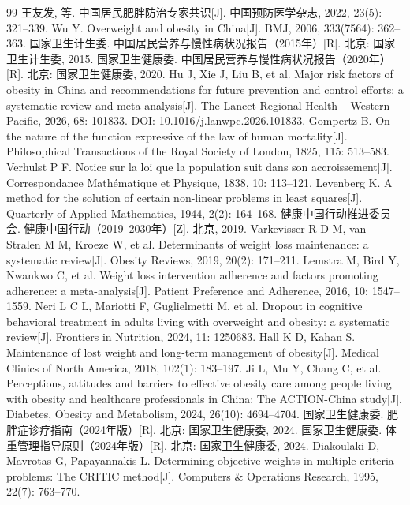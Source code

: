 \begin{thebibliography}{99}
 王友发, 等. 中国居民肥胖防治专家共识[J]. 中国预防医学杂志, 2022, 23(5): 321--339.
 Wu Y. Overweight and obesity in China[J]. BMJ, 2006, 333(7564): 362--363.
 国家卫生计生委. 中国居民营养与慢性病状况报告（2015年）[R]. 北京: 国家卫生计生委, 2015.
 国家卫生健康委. 中国居民营养与慢性病状况报告（2020年）[R]. 北京: 国家卫生健康委, 2020.
 Hu J, Xie J, Liu B, et al. Major risk factors of obesity in China and recommendations for future prevention and control efforts: a systematic review and meta-analysis[J]. The Lancet Regional Health -- Western Pacific, 2026, 68: 101833. DOI: 10.1016/j.lanwpc.2026.101833.
 Gompertz B. On the nature of the function expressive of the law of human mortality[J]. Philosophical Transactions of the Royal Society of London, 1825, 115: 513--583.
 Verhulst P F. Notice sur la loi que la population suit dans son accroissement[J]. Correspondance Math\'{e}matique et Physique, 1838, 10: 113--121.
 Levenberg K. A method for the solution of certain non-linear problems in least squares[J]. Quarterly of Applied Mathematics, 1944, 2(2): 164--168.
 健康中国行动推进委员会. 健康中国行动（2019--2030年）[Z]. 北京, 2019.
 Varkevisser R D M, van Stralen M M, Kroeze W, et al. Determinants of weight loss maintenance: a systematic review[J]. Obesity Reviews, 2019, 20(2): 171--211.
 Lemstra M, Bird Y, Nwankwo C, et al. Weight loss intervention adherence and factors promoting adherence: a meta-analysis[J]. Patient Preference and Adherence, 2016, 10: 1547--1559.
 Neri L C L, Mariotti F, Guglielmetti M, et al. Dropout in cognitive behavioral treatment in adults living with overweight and obesity: a systematic review[J]. Frontiers in Nutrition, 2024, 11: 1250683.
 Hall K D, Kahan S. Maintenance of lost weight and long-term management of obesity[J]. Medical Clinics of North America, 2018, 102(1): 183--197.
 Ji L, Mu Y, Chang C, et al. Perceptions, attitudes and barriers to effective obesity care among people living with obesity and healthcare professionals in China: The ACTION-China study[J]. Diabetes, Obesity and Metabolism, 2024, 26(10): 4694--4704.
 国家卫生健康委. 肥胖症诊疗指南（2024年版）[R]. 北京: 国家卫生健康委, 2024.
 国家卫生健康委. 体重管理指导原则（2024年版）[R]. 北京: 国家卫生健康委, 2024.
 Diakoulaki D, Mavrotas G, Papayannakis L. Determining objective weights in multiple criteria problems: The CRITIC method[J]. Computers \& Operations Research, 1995, 22(7): 763--770.

\end{thebibliography}
